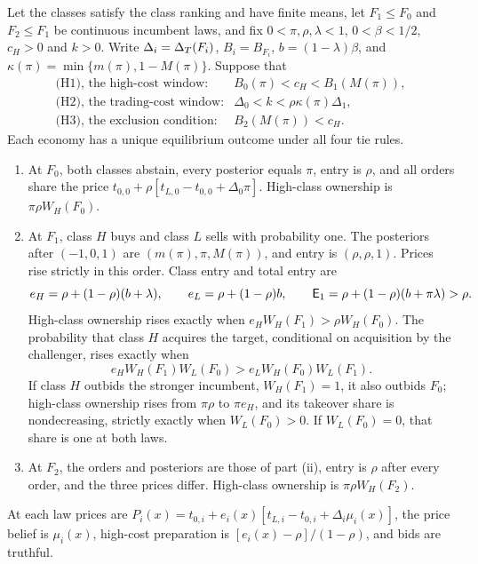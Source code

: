 \setcounter{proposition}{1}
\begin{proposition}\label{prop:ccc}
Let the classes satisfy the class ranking and have finite means, let \(F_1\le F_0\) and \(F_2\le F_1\) be
continuous incumbent laws, and fix \(0<\pi,\rho,\lambda<1\), \(0<\beta<1/2\), \(c_H>0\) and \(k>0\). Write
\(\Delta_i=\Delta_T(F_i)\), \(B_i=B_{F_i}\), \(b=(1-\lambda)\beta\), and
\(\kappa(\pi)=\min\{m(\pi),1-M(\pi)\}\). Suppose that
\[
\begin{array}{ll}
\text{(H1), the high-cost window:}& B_0(\pi)<c_H<B_1(M(\pi)),\\
\text{(H2), the trading-cost window:}& \Delta_0<k<\rho\kappa(\pi)\Delta_1,\\
\text{(H3), the exclusion condition:}& B_2(M(\pi))<c_H.
\end{array}
\]
Each economy has a unique equilibrium outcome under all four tie rules.
\begin{enumerate}[label=(\roman*),leftmargin=2em]
\item At \(F_0\), both classes abstain, every posterior equals \(\pi\), entry is \(\rho\), and all orders share the
price \(t_{0,0}+\rho[t_{L,0}-t_{0,0}+\Delta_0\pi]\). High-class ownership is \(\pi\rho W_H(F_0)\).
\item At \(F_1\), class \(H\) buys and class \(L\) sells with probability one. The posteriors after
\((-1,0,1)\) are \((m(\pi),\pi,M(\pi))\), and entry is \((\rho,\rho,1)\). Prices rise strictly in this order.
Class entry and total entry are
\[
e_H=\rho+(1-\rho)(b+\lambda),\qquad e_L=\rho+(1-\rho)b,\qquad
\mathsf{E}_1=\rho+(1-\rho)(b+\pi\lambda)>\rho.
\]
High-class ownership rises exactly when \(e_HW_H(F_1)>\rho W_H(F_0)\). The probability that class \(H\) acquires
the target, conditional on acquisition by the challenger, rises exactly when
\begin{equation}\label{eq:a3-share}
e_HW_H(F_1)W_L(F_0)>e_LW_H(F_0)W_L(F_1).
\end{equation}
If class \(H\) outbids the stronger incumbent, \(W_H(F_1)=1\), it also outbids \(F_0\); high-class ownership
rises from \(\pi\rho\) to \(\pi e_H\), and its takeover share is nondecreasing, strictly exactly when
\(W_L(F_0)>0\). If \(W_L(F_0)=0\), that share is one at both laws.
\item At \(F_2\), the orders and posteriors are those of part (ii), entry is \(\rho\) after every order, and the
three prices differ. High-class ownership is \(\pi\rho W_H(F_2)\).
\end{enumerate}
At each law prices are \(P_i(x)=t_{0,i}+e_i(x)[t_{L,i}-t_{0,i}+\Delta_i\mu_i(x)]\), the price belief is
\(\mu_i(x)\), high-cost preparation is \([e_i(x)-\rho]/(1-\rho)\), and bids are truthful.
\end{proposition}

